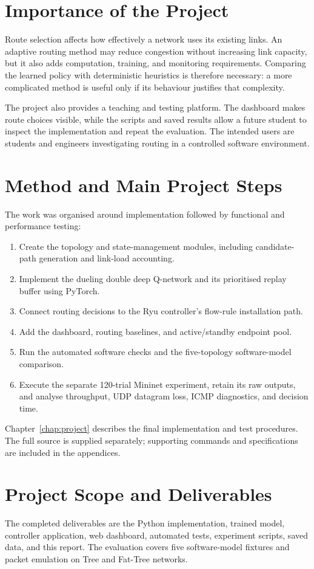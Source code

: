 \documentclass[12pt,a4paper,oneside]{report}
\begin{document}
\section{Importance of the Project}
Route selection affects how effectively a network uses its existing links. An adaptive routing method may reduce congestion without increasing link capacity, but it also adds computation, training, and monitoring requirements. Comparing the learned policy with deterministic heuristics is therefore necessary: a more complicated method is useful only if its behaviour justifies that complexity.

The project also provides a teaching and testing platform. The dashboard makes route choices visible, while the scripts and saved results allow a future student to inspect the implementation and repeat the evaluation. The intended users are students and engineers investigating routing in a controlled software environment.

\section{Method and Main Project Steps}
The work was organised around implementation followed by functional and performance testing:
\begin{enumerate}
    \item Create the topology and state-management modules, including candidate-path generation and link-load accounting.
    \item Implement the dueling double deep Q-network and its prioritised replay buffer using PyTorch.
    \item Connect routing decisions to the Ryu controller's flow-rule installation path.
    \item Add the dashboard, routing baselines, and active/standby endpoint pool.
    \item Run the automated software checks and the five-topology software-model comparison.
    \item Execute the separate 120-trial Mininet experiment, retain its raw outputs, and analyse throughput, UDP datagram loss, ICMP diagnostics, and decision time.
\end{enumerate}
Chapter~\ref{chap:project} describes the final implementation and test procedures. The full source is supplied separately; supporting commands and specifications are included in the appendices.

\section{Project Scope and Deliverables}
The completed deliverables are the Python implementation, trained model, controller application, web dashboard, automated tests, experiment scripts, saved data, and this report. The evaluation covers five software-model fixtures and packet emulation on Tree and Fat-Tree networks.
\end{document}
